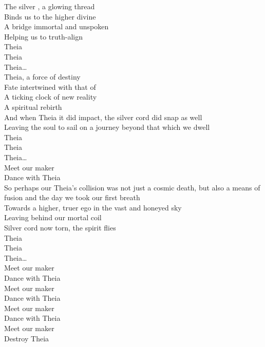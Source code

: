 



The silver , a glowing thread \\
Binds us to the higher divine \\
A bridge immortal and unspoken \\
Helping us to truth-align \\

Theia \\
Theia \\
Theia… \\

Theia, a force of destiny \\
Fate intertwined with that of  \\
A ticking clock of new reality \\
A spiritual rebirth \\
And when Theia it did impact, the silver cord did snap as well \\
Leaving the soul to sail on a journey beyond that which we dwell \\

Theia \\
Theia \\
Theia… \\

Meet our maker \\
Dance with Theia \\

So perhaps our Theia's collision was not just a cosmic death, but also a means of fusion and the day we took our first breath \\
Towards a higher, truer ego in the vast and honeyed sky \\
Leaving behind our mortal coil \\
Silver cord now torn, the spirit flies \\

Theia \\
Theia \\
Theia… \\

Meet our maker \\
Dance with Theia \\
Meet our maker \\
Dance with Theia \\
Meet our maker \\
Dance with Theia \\
Meet our maker \\
Destroy Theia \\


